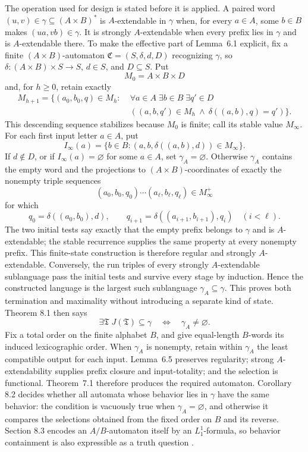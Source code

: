 The operation used for design is stated before it is applied.  A paired word
\((u,v)\in\gamma\subseteq(A\times B)^*\) is \(A\)-extendable in \(\gamma\)
when, for every \(a\in A\), some \(b\in B\) makes
\((ua,vb)\in\gamma\).  It is strongly \(A\)-extendable when every prefix lies
in \(\gamma\) and is \(A\)-extendable there.  To make the effective part of
Lemma~6.1 explicit, fix a finite \((A\times B)\)-automaton
\(\mathfrak C=(S,\delta,d,D)\) recognizing \(\gamma\), so
\(\delta:(A\times B)\times S\to S\), \(d\in S\), and \(D\subseteq S\).  Put
\[
 M_0=A\times B\times D
\]
and, for \(h\geq0\), retain exactly
\[
 \begin{split}
 M_{h+1}=\{(a_0,b_0,q)\in M_h:\;&
   \forall a\in A\;\exists b\in B\;\exists q'\in D\\
 &((a,b,q')\in M_h\ \land\
   \delta((a,b),q)=q')\}.
 \end{split}
\]
This descending sequence stabilizes because \(M_0\) is finite; call its stable
value \(M_\infty\).  For each first input letter \(a\in A\), put
\[
 I_\infty(a)
 =\{b\in B:(a,b,\delta((a,b),d))\in M_\infty\}.
\]
If \(d\notin D\), or if \(I_\infty(a)=\varnothing\) for some \(a\in A\), set
\(\gamma_A=\varnothing\).  Otherwise \(\gamma_A\) contains the empty word and
the projections to \((A\times B)\)-coordinates of exactly the nonempty triple
sequences
\[
 (a_0,b_0,q_0)\cdots(a_\ell,b_\ell,q_\ell)\in M_\infty^+
\]
for which
\[
 q_0=\delta((a_0,b_0),d),
 \qquad
 q_{i+1}=\delta((a_{i+1},b_{i+1}),q_i)\quad(i<\ell).
\]
The two initial tests say exactly that the empty prefix belongs to \(\gamma\)
and is \(A\)-extendable; the stable recurrence supplies the same property at
every nonempty prefix.  This finite-state construction is therefore regular and
strongly \(A\)-extendable.  Conversely, the run triples of every strongly
\(A\)-extendable sublanguage pass the initial tests and survive every stage by
induction.  Hence the constructed language is the largest such sublanguage
\(\gamma_A\subseteq\gamma\).  This proves both termination and maximality
without introducing a separate kind of state.  Theorem 8.1 then says
\[
 \exists\mathfrak T\;J(\mathfrak T)\subseteq\gamma
 \quad\Longleftrightarrow\quad
 \gamma_A\ne\varnothing.
\]
Fix a total order on the finite alphabet \(B\), and give equal-length
\(B\)-words its induced lexicographic order.  When \(\gamma_A\) is nonempty,
retain within \(\gamma_A\) the least compatible output for each input.
Lemma~6.5 preserves regularity; strong \(A\)-extendability supplies prefix
closure and input-totality; and the selection is functional.  Theorem~7.1
therefore produces the required automaton.  Corollary 8.2 decides whether all automata
whose behavior lies in \(\gamma\) have the same behavior: the condition is
vacuously true when \(\gamma_A=\varnothing\), and otherwise it compares the
selections obtained from the fixed order on \(B\) and its reverse.  Section 8.3 encodes
an \(A/B\)-automaton itself by an \(L_1^1\)-formula, so behavior containment is
also expressible as a truth question \cite[pp.~37--46]{Elgot1961}.

